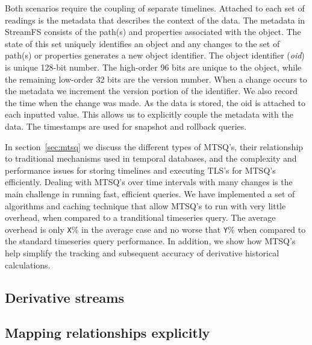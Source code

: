 Both scenarios require the coupling of separate timelines.  Attached to each set of readings is the metadata that describes the context of
the data.  The metadata in StreamFS consists of the path(s) and properties associated with the object.  The state of this set uniquely identifies
an object and any changes to the set of path(s) or properties generates a new object identifier.  The object identifier (\emph{oid}) is 
unique 128-bit number.  The high-order 96 bits are unique to the object, while the remaining low-order 32 bits are the version number.  When a change
occurs to the metadata we increment the version portion of the identifier.  We also record the time when the change was made.  As the data is stored, 
the oid is attached to each inputted value.  This allows us to explicitly couple the metadata with the data.  The timestamps are used for
snapshot and rollback queries.




In section~\ref{sec:mtsq} we discuss the different types of MTSQ's, their relationship to traditional mechanisms used in temporal databases, and
the complexity and performance issues for storing timelines and executing TLS's for MTSQ's efficiently.  Dealing with MTSQ's over time intervals 
with many changes is the main challenge in running fast, efficient queries.  We have implemented a set of algorithms and caching technique that
allow MTSQ's to run with very little overhead, when compared to a tranditional timeseries query.  The average overhead is only {\tt X}\% in the average
case and no worse that {\tt Y}\% when compared to the standard timeseries query performance.  In addition, we show how MTSQ's help simplify the
tracking and subsequent accuracy of derivative historical calculations.


\subsection{Derivative streams}


\subsection{Mapping relationships explicitly}













